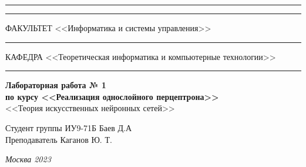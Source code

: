 \documentclass[a4paper, 14pt]{extarticle}
\begin{document}
\begin{titlepage}
\vspace{-25pt}
\hspace{-35pt}\rule{\textwidth}{2.3pt}

\vspace*{-20.3pt}
\hspace{-35pt}\rule{\textwidth}{0.4pt}

\vspace{1.5ex}
\hspace{-35pt} \noindent \small ФАКУЛЬТЕТ\hspace{80pt} <<Информатика и системы управления>>

\vspace*{-16pt}
\hspace{47pt}\rule{0.83\textwidth}{0.4pt}

\vspace{0.5ex}
\hspace{-35pt} \noindent \small КАФЕДРА\hspace{50pt} <<Теоретическая информатика и компьютерные технологии>>

\vspace*{-16pt}
\hspace{30pt}\rule{0.866\textwidth}{0.4pt}

\vspace{11em}

\begin{center}
\Large {\bf Лабораторная работа № 1 } \\
\large {\bf по курсу <<Реализация однослойного перцептрона>>} \\
\large <<Теория искусственных нейронных сетей>>
\end{center}\normalsize

\vspace{8em}


\begin{flushright}
  {Студент группы ИУ9-71Б Баев Д.А \hspace*{15pt}\\
  \vspace{2ex}
  Преподаватель Каганов Ю. Т.\hspace*{15pt}}
\end{flushright}

\bigskip

\vfill


\begin{center}
\textsl{Москва 2023}
\end{center}
\end{titlepage}
\end{document}
